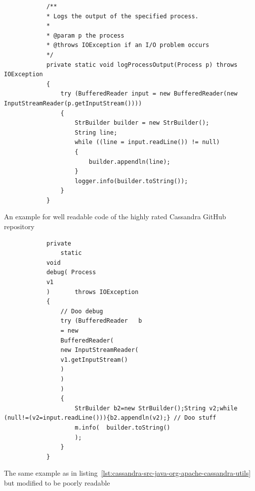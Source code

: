 \documentclass[%
class=scrreprt,
chapterprefix=false,%
open=right,%
twoside=false,%
paper=a4,%
logofile={Logo\_zentral\_farbig\_EN.png},%
thesistype=master,%
UKenglish,%
]{se2thesis}
\begin{document}
	
	\begin{listing}[!ht]
		\begin{verbatim}
			/**
			* Logs the output of the specified process.
			*
			* @param p the process
			* @throws IOException if an I/O problem occurs
			*/
			private static void logProcessOutput(Process p) throws IOException
			{
				try (BufferedReader input = new BufferedReader(new InputStreamReader(p.getInputStream())))
				{
					StrBuilder builder = new StrBuilder();
					String line;
					while ((line = input.readLine()) != null)
					{
						builder.appendln(line);
					}
					logger.info(builder.toString());
				}
			}
		\end{verbatim}
		\caption[An example for well readable code of the highly rated Cassandra GitHub repository]{An example for well readable code of the highly rated Cassandra GitHub repository}
		\label{lst:cassandra-src-java-org-apache-cassandra-utils}
	\end{listing}
	
	\begin{listing}[!ht]
		\begin{verbatim}
			private 
				static 
			void 
			debug( Process 
			v1 
			)       throws IOException
			{
				// Doo debug
				try (BufferedReader   b 
				= new 
				BufferedReader(
				new InputStreamReader(
				v1.getInputStream()
				)
				)
				)
				{
					StrBuilder b2=new StrBuilder();String v2;while (null!=(v2=input.readLine())){b2.appendln(v2);} // Doo stuff
					m.info(  builder.toString()
					);
				}
			}
		\end{verbatim}
		\caption{The same example as in listing~\ref{lst:cassandra-src-java-org-apache-cassandra-utils} but modified to be poorly readable}
		\label{lst:cassandra-src-java-org-apache-cassandra-utils-modified}
	\end{listing}
	
\end{document}
